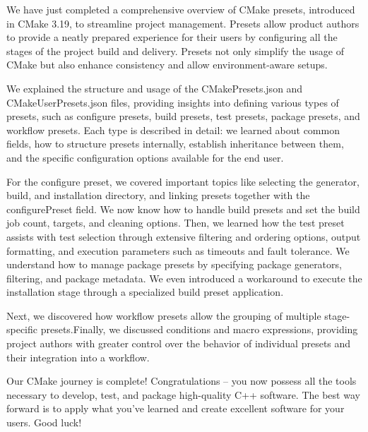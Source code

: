 We have just completed a comprehensive overview of CMake presets, introduced in CMake 3.19, to streamline project management. Presets allow product authors to provide a neatly prepared experience for their users by configuring all the stages of the project build and delivery. Presets not only simplify the usage of CMake but also enhance consistency and allow environment-aware setups.

We explained the structure and usage of the CMakePresets.json and CMakeUserPresets.json files, providing insights into defining various types of presets, such as configure presets, build presets, test presets, package presets, and workflow presets. Each type is described in detail: we learned about common fields, how to structure presets internally, establish inheritance between them, and the specific configuration options available for the end user.

For the configure preset, we covered important topics like selecting the generator, build, and installation directory, and linking presets together with the configurePreset field. We now know how to handle build presets and set the build job count, targets, and cleaning options. Then, we learned how the test preset assists with test selection through extensive filtering and ordering options, output formatting, and execution parameters such as timeouts and fault tolerance. We understand how to manage package presets by specifying package generators, filtering, and package metadata. We even introduced a workaround to execute the installation stage through a specialized build preset application.

Next, we discovered how workflow presets allow the grouping of multiple stage-specific presets.Finally, we discussed conditions and macro expressions, providing project authors with greater control over the behavior of individual presets and their integration into a workflow.

Our CMake journey is complete! Congratulations – you now possess all the tools necessary to develop, test, and package high-quality C++ software. The best way forward is to apply what you’ve learned and create excellent software for your users. Good luck!